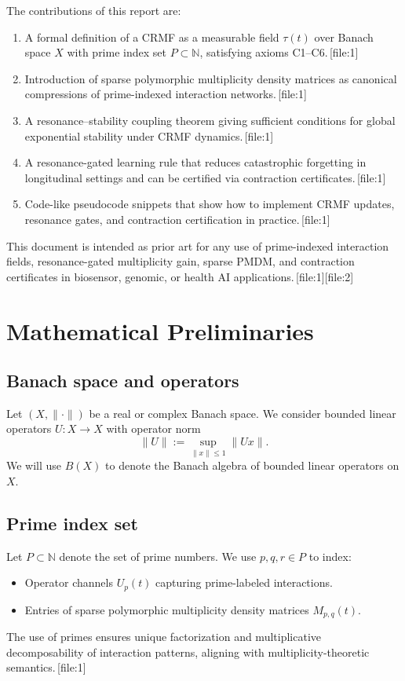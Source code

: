 \documentclass[11pt]{article}
\begin{document}
The contributions of this report are:
\begin{enumerate}[leftmargin=1.75em]
  \item A formal definition of a CRMF as a measurable field $\tau(t)$ over Banach space $X$ with prime index set $P \subset \mathbb{N}$, satisfying axioms C1--C6.\,[file:1]
  \item Introduction of sparse polymorphic multiplicity density matrices as canonical compressions of prime-indexed interaction networks.\,[file:1]
  \item A resonance--stability coupling theorem giving sufficient conditions for global exponential stability under CRMF dynamics.\,[file:1]
  \item A resonance-gated learning rule that reduces catastrophic forgetting in longitudinal settings and can be certified via contraction certificates.\,[file:1]
  \item Code-like pseudocode snippets that show how to implement CRMF updates, resonance gates, and contraction certification in practice.\,[file:1]
\end{enumerate}
This document is intended as prior art for any use of prime-indexed interaction fields, resonance-gated multiplicity gain, sparse PMDM, and contraction certificates in biosensor, genomic, or health AI applications.\,[file:1][file:2]

\section{Mathematical Preliminaries}

\subsection{Banach space and operators}

Let $(X, \|\cdot\|)$ be a real or complex Banach space.
We consider bounded linear operators $U : X \to X$ with operator norm
\[
  \|U\| := \sup_{\|x\| \leq 1} \|Ux\|.
\]
We will use $B(X)$ to denote the Banach algebra of bounded linear operators on $X$.

\subsection{Prime index set}

Let $P \subset \mathbb{N}$ denote the set of prime numbers.
We use $p, q, r \in P$ to index:
\begin{itemize}[leftmargin=1.5em]
  \item Operator channels $U_p(t)$ capturing prime-labeled interactions.
  \item Entries of sparse polymorphic multiplicity density matrices $M_{p,q}(t)$.
\end{itemize}
The use of primes ensures unique factorization and multiplicative decomposability of interaction patterns, aligning with multiplicity-theoretic semantics.\,[file:1]
\end{document}
